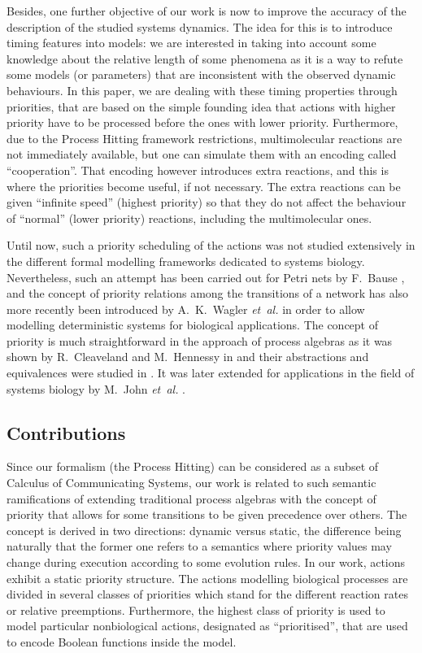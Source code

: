 Besides, one further objective of our work is now %
to improve the accuracy of the description of the studied systems dynamics.
The idea for this is to introduce timing features into models:
we are interested in taking into account some knowledge about the relative length of some phenomena as it is a way to refute some models (or parameters) that are inconsistent with the observed dynamic behaviours.
In this paper, we are dealing with these timing properties through priorities,
that are based on the simple founding idea that actions with higher priority have to be processed before the ones with lower priority.
Furthermore, due to the Process Hitting framework restrictions, multimolecular reactions are not immediately available, but one can simulate them with an encoding called “cooperation”.
That encoding however introduces extra reactions, and this is where the priorities become useful, if not necessary.
The extra reactions can be given “infinite speed” (highest priority) so that they do not affect the behaviour of “normal” (lower priority) reactions, including the multimolecular ones.

Until now, such a priority scheduling of the actions was not studied extensively in the different formal modelling frameworks dedicated to systems biology.
Nevertheless, such an attempt has been carried out for Petri nets by F.~Bause \cite{Bause97},
and the concept of priority relations among the transitions of a network has also more recently been introduced by A.~K.~Wagler \textit{et~al.} \cite{waw,WaglerW12} in order to allow modelling deterministic systems for biological applications.
The concept of priority is much straightforward in the approach of process algebras as it was shown by R.~Cleaveland and M.~Hennessy in \cite{Cleaveland199058,Cleaveland99prioritiesin} and their abstractions and equivalences were studied in \cite{Cleaveland:2007:PAP:1282576.1282847}.
It was later extended for applications in the field of systems biology by M.~John \textit{et~al.} \cite{jlnu2010}.

\subsection*{Contributions}
Since our formalism (the Process Hitting) can be considered as a subset of Calculus of Communicating Systems, %
our work is related to such semantic ramifications of extending traditional process algebras with the concept of priority that allows for some transitions to be given precedence over others.
The concept is derived in two directions: dynamic versus static, the difference being naturally that the former one refers to a semantics where priority values may change during execution according to some evolution rules.
In our work, actions exhibit a static priority structure.
The actions modelling biological processes are divided in several classes of priorities which stand for the different reaction rates or relative preemptions.
Furthermore, the highest class of priority is used to model particular nonbiological actions, designated as “prioritised”,
that are used to encode Boolean functions inside the model.

